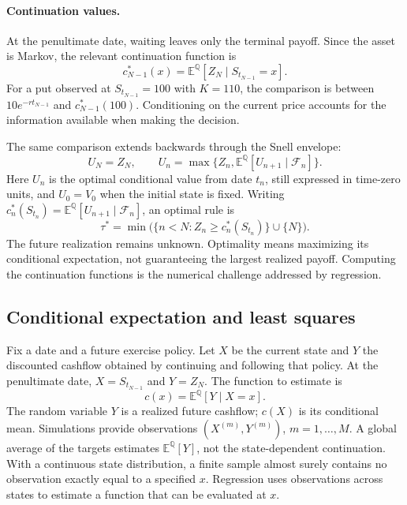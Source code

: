 \documentclass[11pt,a4paper]{article}
\newcommand{\E}{\mathbb E^{\mathbb Q}}
\begin{document}
\paragraph{Continuation values.}
At the penultimate date, waiting leaves only the terminal payoff. Since the
asset is Markov, the relevant continuation function is
\begin{equation}
 c_{N-1}^*(x)=\E[Z_N\mid S_{t_{N-1}}=x].
\end{equation}
For a put observed at $S_{t_{N-1}}=100$ with $K=110$, the comparison is between
$10e^{-rt_{N-1}}$ and $c_{N-1}^*(100)$. Conditioning on the current price
accounts for the information available when making the decision.

The same comparison extends backwards through the Snell envelope:
\begin{equation}\label{eq:snell}
 U_N=Z_N,\qquad
 U_n=\max\{Z_n,\E[U_{n+1}\mid\mathcal F_n]\}.
\end{equation}
Here $U_n$ is the optimal conditional value from date $t_n$, still expressed
in time-zero units, and $U_0=V_0$ when the initial state is fixed.
Writing $c_n^*(S_{t_n})=\E[U_{n+1}\mid\mathcal F_n]$, an optimal rule is
\begin{equation}
 \tau^*=\min\bigl(\{n<N:Z_n\geq c_n^*(S_{t_n})\}\cup\{N\}\bigr).
\end{equation}
The future realization remains unknown. Optimality means maximizing its
conditional expectation, not guaranteeing the largest realized payoff.
Computing the continuation functions is the numerical challenge addressed
by regression.

\subsection{Conditional expectation and least squares}
Fix a date and a future exercise policy. Let $X$ be the current state and
$Y$ the discounted cashflow obtained by continuing and following that policy.
At the penultimate date, $X=S_{t_{N-1}}$ and $Y=Z_N$.
The function to estimate is
\begin{equation}
 c(x)=\E[Y\mid X=x].
\end{equation}
The random variable $Y$ is a realized future cashflow; $c(X)$ is its conditional
mean. Simulations provide observations $(X^{(m)},Y^{(m)})$, $m=1,\ldots,M$.
A global average of the targets estimates $\E[Y]$, not the state-dependent
continuation. With a continuous state distribution, a finite sample almost
surely contains no observation exactly equal to a specified $x$. Regression
uses observations across states to estimate a function that can be evaluated at $x$.
\end{document}
